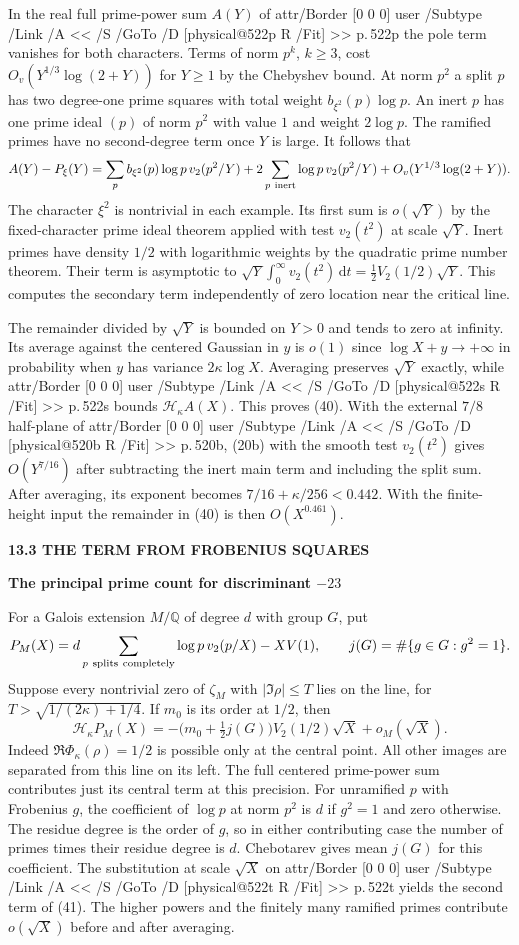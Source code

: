\documentclass[11pt,letterpaper]{article}
\makeatletter
\newcommand{\rightmarktext}{}
\newcommand{\printfolio}{}
\newcommand{\leaf}[4]{\clearpage\gdef\printfolio{#1}\gdef\rightmarktext{#2}%
  {\small\sffamily\bfseries\color{ink}#3\par}\vspace{3pt}%
  {\LARGE\bfseries #4\par}\vspace{5pt}}
\newcommand{\Q}{\mathbb Q}
\newcommand{\dd}{\,\mathrm d}
\newcommand{\MusicPDFPageRef}[1]{\pdfpageref\csname physical@#1\endcsname\space\space 0 R}
\newcommand{\pagelink}[2]{\leavevmode\pdfstartlink attr{/Border [0 0 0]} user{%
  /Subtype /Link /A << /S /GoTo /D [\MusicPDFPageRef{#1} /Fit] >>}%
  {\color{ink}#2}\pdfendlink}
\newcommand{\pg}[1]{\pagelink{#1}{p.\,#1}}
\makeatother
\begin{document}
In the real full prime-power sum $A(Y)$ of \pg{522p} the pole term
vanishes for both characters. Terms of norm $p^k$, $k\ge3$, cost
$O_v(Y^{1/3}\log(2+Y))$ for $Y\ge1$ by the Chebyshev bound. At norm
$p^2$ a split $p$ has two degree-one prime squares with total weight
$b_{\xi^2}(p)\log p$. An inert $p$ has one prime ideal $(p)$ of
norm $p^2$ with value $1$ and weight $2\log p$. The ramified
primes have no second-degree term once $Y$ is large. It follows that
\[
 A(Y)-P_\xi(Y)=\sum_p b_{\xi^2}(p)\log p\,v_2(p^2/Y)
          +2\sum_{p\ {\rm inert}}\log p\,v_2(p^2/Y)
          +O_v(Y^{1/3}\log(2+Y)).
\]
The character $\xi^2$ is nontrivial in each example. Its first sum is
$o(\sqrt Y)$ by the fixed-character prime ideal theorem applied with
test $v_2(t^2)$ at scale $\sqrt Y$. Inert primes have density $1/2$
with logarithmic weights by the quadratic prime number theorem.
Their term is asymptotic to $\sqrt Y\int_0^\infty v_2(t^2)\dd t
=\tfrac12 V_2(1/2)\sqrt Y$. This computes the secondary term
independently of zero location near the critical line.

The remainder divided by $\sqrt Y$ is bounded on $Y>0$ and tends
to zero at infinity. Its average against the centered Gaussian in
$y$ is $o(1)$ since $\log X+y\to+\infty$ in probability when
$y$ has variance $2\kappa\log X$. Averaging preserves $\sqrt Y$
exactly, while \pg{522s} bounds $\mathcal H_\kappa A(X)$. This proves
(40). With the external $7/8$ half-plane of \pg{520b}, (20b) with the
smooth test $v_2(t^2)$ gives $O(Y^{7/16})$ after subtracting the
inert main term and including the split sum. After averaging, its
exponent becomes $7/16+\kappa/256<0.442$. With the finite-height
input the remainder in (40) is then $O(X^{0.461})$.

\leaf{522u}{Completely split primes}{13.3 \quad THE TERM FROM FROBENIUS SQUARES}{The principal prime count for discriminant \(-23\)}
For a Galois extension $M/\Q$ of degree $d$ with group $G$, put
\[
 P_M(X)=d\sum_{p\ {\rm splits\ completely}}\log p\,v_2(p/X)
                                      -X V(1),\qquad
 j(G)=\#\{g\in G:g^2=1\}.
\]
Suppose every nontrivial zero of $\zeta_M$ with $|\Im\rho|\le T$ lies
on the line, for $T>\sqrt{1/(2\kappa)+1/4}$. If $m_0$ is its order
at $1/2$, then
\[
 \mathcal H_\kappa P_M(X)
    =-\big(m_0+\tfrac12 j(G)\big)V_2(1/2)\sqrt X+o_M(\sqrt X).
 \tag{41}
\]
Indeed $\Re\Phi_\kappa(\rho)=1/2$ is possible only at the central
point. All other images are separated from this line on its left. The full centered
prime-power sum contributes just its central term at this precision.
For unramified $p$ with Frobenius $g$, the coefficient of $\log p$
at norm $p^2$ is $d$ if $g^2=1$ and zero otherwise. The residue degree
is the order of $g$, so in either contributing case the number of
primes times their residue degree is $d$. Chebotarev gives mean
$j(G)$ for this coefficient. The substitution at scale $\sqrt X$ on
\pg{522t} yields the second term of (41). The higher powers and the finitely many
ramified primes contribute $o(\sqrt X)$ before and after averaging.
\end{document}
